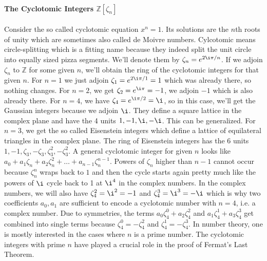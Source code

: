 \paragraph{The Cyclotomic Integers $\mathbb{Z}[\zeta_n]$}
Consider the so called cyclotomic equation $x^n = 1$. Its solutions are the $n$th roots of unity which are sometimes also called de Moivre numbers. Cylcotomic means circle-splitting which is a fitting name because they indeed split the unit circle into equally sized pizza segments. We'll denote them by $\zeta_n = e^{2 \i \pi / n}$.  If we adjoin $\zeta_n$ to $\mathbb{Z}$ for some given $n$, we'll obtain the ring of the cyclotomic integers for that given $n$. For $n=1$ we just adjoin $\zeta_1 = e^{2 \i \pi / 1} = 1$ which was already there, so nothing changes. For $n=2$, we get $\zeta_2 = e^{\i \pi} = -1$, we adjoin $-1$ which is also already there. For $n=4$, we have $\zeta_4 = e^{\i \pi / 2} = \i$, so in this case, we'll get the Gaussian integers because we adjoin $\i$. They define a square lattice in the complex plane and have the 4 units $1,-1,\i,-\i$. This can be generalized. For $n=3$, we get the so called Eisenstein integers which define a lattice of equilateral triangles in the complex plane. The ring of Eisenstein integers has the 6 units $1, -1, \zeta_3, -\zeta_3, \zeta_3^2, -\zeta_3^2$. A general cyclotomic integer for given $n$ looks like $a_0 + a_1 \zeta_n + a_2 \zeta_n^2 + \ldots + a_{n-1} \zeta_n^{n-1}$. Powers of $\zeta_n$ higher than $n-1$ cannot occur because $\zeta_n^n$ wraps back to $1$ and then the cycle starts again pretty much like the powers of $\i$ cycle back to 1 at $\i^4$ in the complex numbers. In the complex numbers, we will also have $\zeta_4^2 = \i^2 = -1$ and $\zeta_4^3 = \i^3 = -\i$ which is why two coefficients $a_0, a_1$ are sufficient to encode a cyclotomic number with $n=4$, i.e. a complex number. Due to symmetries, the terms $a_0 \zeta_4^0 + a_2 \zeta_4^2$ and $a_1 \zeta_4^1 + a_3 \zeta_4^3$ get combined into single terms because $\zeta_4^0 = -\zeta_4^2$ and $\zeta_4^1 = -\zeta_4^3$. In number theory, one is mostly interested in the cases where $n$ is a prime number. The cyclotomic integers with prime $n$ have played a crucial role in the proof of Fermat's Last Theorem.



